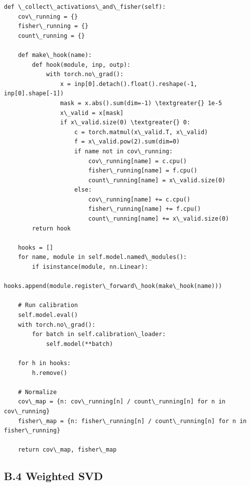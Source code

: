 \begin{lstlisting}
def \_collect\_activations\_and\_fisher(self):
    cov\_running = {}
    fisher\_running = {}
    count\_running = {}
    
    def make\_hook(name):
        def hook(module, inp, outp):
            with torch.no\_grad():
                x = inp[0].detach().float().reshape(-1, inp[0].shape[-1])
                mask = x.abs().sum(dim=-1) \textgreater{} 1e-5
                x\_valid = x[mask]
                if x\_valid.size(0) \textgreater{} 0:
                    c = torch.matmul(x\_valid.T, x\_valid)
                    f = x\_valid.pow(2).sum(dim=0)
                    if name not in cov\_running:
                        cov\_running[name] = c.cpu()
                        fisher\_running[name] = f.cpu()
                        count\_running[name] = x\_valid.size(0)
                    else:
                        cov\_running[name] += c.cpu()
                        fisher\_running[name] += f.cpu()
                        count\_running[name] += x\_valid.size(0)
        return hook
    
    hooks = []
    for name, module in self.model.named\_modules():
        if isinstance(module, nn.Linear):
            hooks.append(module.register\_forward\_hook(make\_hook(name)))
    
    # Run calibration
    self.model.eval()
    with torch.no\_grad():
        for batch in self.calibration\_loader:
            self.model(**batch)
    
    for h in hooks:
        h.remove()
    
    # Normalize
    cov\_map = {n: cov\_running[n] / count\_running[n] for n in cov\_running}
    fisher\_map = {n: fisher\_running[n] / count\_running[n] for n in fisher\_running}
    
    return cov\_map, fisher\_map
\end{lstlisting}

\subsection{B.4 Weighted SVD}

